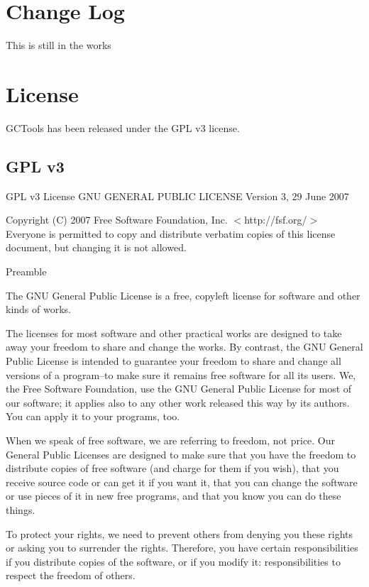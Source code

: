 \documentclass{article}
\begin{document}
\newpage

\section{Change Log}
This is still in the works

\newpage

\section{License}
GCTools has been released under the GPL v3 license.
\subsection{GPL v3}
GPL v3 License
                    GNU GENERAL PUBLIC LICENSE
                       Version 3, 29 June 2007

 Copyright (C) 2007 Free Software Foundation, Inc. $<$http://fsf.org/$>$
 Everyone is permitted to copy and distribute verbatim copies
 of this license document, but changing it is not allowed.

                            Preamble

  The GNU General Public License is a free, copyleft license for
software and other kinds of works.

  The licenses for most software and other practical works are designed
to take away your freedom to share and change the works.  By contrast,
the GNU General Public License is intended to guarantee your freedom to
share and change all versions of a program--to make sure it remains free
software for all its users.  We, the Free Software Foundation, use the
GNU General Public License for most of our software; it applies also to
any other work released this way by its authors.  You can apply it to
your programs, too.

  When we speak of free software, we are referring to freedom, not
price.  Our General Public Licenses are designed to make sure that you
have the freedom to distribute copies of free software (and charge for
them if you wish), that you receive source code or can get it if you
want it, that you can change the software or use pieces of it in new
free programs, and that you know you can do these things.

  To protect your rights, we need to prevent others from denying you
these rights or asking you to surrender the rights.  Therefore, you have
certain responsibilities if you distribute copies of the software, or if
you modify it: responsibilities to respect the freedom of others.
\end{document}
